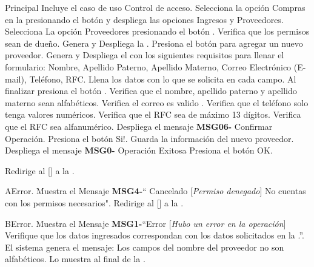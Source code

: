 	\begin{UCtrayectoria}{Principal}
		\UCpaso Incluye el caso de uso  Control de acceso.
		\UCpaso[\UCactor] Selecciona la opción Compras en la  presionando el botón  y despliega las opciones Ingresos y Proveedores.
		\UCpaso[\UCactor] Selecciona La opción Proveedores presionando el botón .
		\UCpaso Verifica que los permisos sean de dueño. 
		\UCpaso Genera y Despliega la .
		\UCpaso [\UCactor] Presiona el botón  para agregar un nuevo proveedor.
		\UCpaso Genera y Despliega el  con los siguientes requisitos para llenar el formulario: Nombre, Apellido Paterno, Apellido Materno, Correo Electrónico (E-mail), Teléfono, RFC.
		\UCpaso[\UCactor] Llena los datos con lo que se solicita en cada campo.
		\UCpaso[\UCactor]Al finalizar presiona el botón .
		\UCpaso Verifica que el nombre, apellido paterno y apellido materno sean alfabéticos. 
		\UCpaso Verifica el correo es valido .
		\UCpaso Verifica que el teléfono solo tenga valores numéricos. 
		\UCpaso Verifica que el RFC sea de máximo 13 dígitos. 
		\UCpaso Verifica que el RFC sea alfanumérico. 
		\UCpaso Despliega el mensaje {\bf MSG06-} {Confirmar Operación}. 
		\UCpaso [\UCactor] Presiona el botón {Si!}. 
		\UCpaso Guarda la información del nuevo proveedor.
		\UCpaso Despliega el mensaje {\bf MSG0-} {Operación Exitosa}
		\UCpaso [\UCactor] Presiona el botón {OK}.

		\UCpaso Redirige al [\UCactor] a la  .
	\end{UCtrayectoria}


\begin{UCtrayectoriaA}{A}{Error.}
			\UCpaso Muestra el Mensaje {\bf MSG4-}`` Cancelado [{\em Permiso denegado}] No cuentas con los permisos necesarios".
			\UCpaso  Redirige al [\UCactor] a la .
		\end{UCtrayectoriaA}

\begin{UCtrayectoriaA}{B}{Error.}
			\UCpaso Muestra el Mensaje {\bf MSG1-}``Error [{\em Hubo un error en la operación}] Verifique que los datos ingresados correspondan con los datos solicitados en la  .''.
			\UCpaso El sistema genera el mensaje: Los campos del nombre del proveedor no son alfabéticos.
			\UCpaso Lo muestra al final de la  .
		\end{UCtrayectoriaA}

